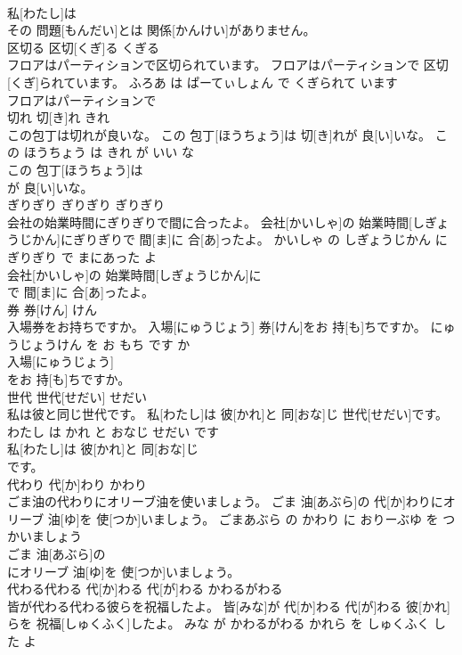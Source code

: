 \documentclass[8pt]{extreport}
\begin{document}
\begin{CJK}{UTF8}{min}
\\	私[わたし]は
\\	その 問題[もんだい]とは 関係[かんけい]がありません。			
\\	区切る	区切[くぎ]る	くぎる	
\\	フロアはパーティションで区切られています。	フロアはパーティションで 区切[くぎ]られています。	ふろあ は ぱーてぃしょん で くぎられて います	
\\	フロアはパーティションで
\\	切れ	切[き]れ	きれ	
\\	この包丁は切れが良いな。	この 包丁[ほうちょう]は 切[き]れが 良[い]いな。	この ほうちょう は きれ が いい な	
\\	この 包丁[ほうちょう]は
\\	が 良[い]いな。			
\\	ぎりぎり	ぎりぎり	ぎりぎり	
\\	会社の始業時間にぎりぎりで間に合ったよ。	会社[かいしゃ]の 始業時間[しぎょうじかん]にぎりぎりで 間[ま]に 合[あ]ったよ。	かいしゃ の しぎょうじかん に ぎりぎり で まにあった よ	
\\	会社[かいしゃ]の 始業時間[しぎょうじかん]に
\\	で 間[ま]に 合[あ]ったよ。			
\\	券	券[けん]	けん	
\\	入場券をお持ちですか。	入場[にゅうじょう] 券[けん]をお 持[も]ちですか。	にゅうじょうけん を お もち です か	
\\	入場[にゅうじょう]
\\	をお 持[も]ちですか。			
\\	世代	世代[せだい]	せだい	
\\	私は彼と同じ世代です。	私[わたし]は 彼[かれ]と 同[おな]じ 世代[せだい]です。	わたし は かれ と おなじ せだい です	
\\	私[わたし]は 彼[かれ]と 同[おな]じ
\\	です。			
\\	代わり	代[か]わり	かわり	
\\	ごま油の代わりにオリーブ油を使いましょう。	ごま 油[あぶら]の 代[か]わりにオリーブ 油[ゆ]を 使[つか]いましょう。	ごまあぶら の かわり に おりーぶゆ を つかいましょう	
\\	ごま 油[あぶら]の
\\	にオリーブ 油[ゆ]を 使[つか]いましょう。			
\\	代わる代わる	代[か]わる 代[が]わる	かわるがわる	
\\	皆が代わる代わる彼らを祝福したよ。	皆[みな]が 代[か]わる 代[が]わる 彼[かれ]らを 祝福[しゅくふく]したよ。	みな が かわるがわる かれら を しゅくふく した よ	

\end{CJK}
\end{document}
